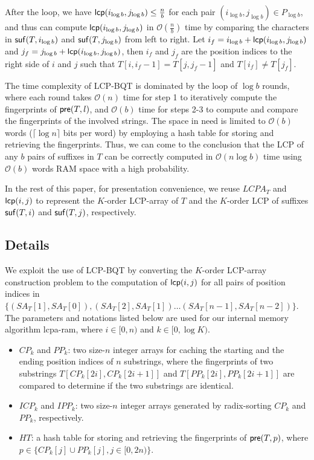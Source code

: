 \documentclass[10pt,journal,compsoc]{IEEEtran}
\begin{document}
\begin{CJK*}{GBK}{song}
After the loop, we have ${\sf lcp}(i_{\log b},j_{\log b}) \le \frac{n}{b}$ for each pair $(i_{\log b},j_{\log b}) \in P_{\log b}$, and thus can compute ${\sf lcp}(i_{\log b}, j_{\log b})$ in $\mathcal{O}(\frac{n}{b})$ time by comparing the characters in ${\sf suf}(T,i_{\log b})$ and ${\sf suf}(T,j_{\log b})$ from left to right. Let $i_{f} = i_{\log b} + {\sf lcp}(i_{\log b}, j_{\log b})$ and $j_{f}= j_{\log b} + {\sf lcp}(i_{\log b}, j_{\log b})$, then $i_{f}$ and $j_{f}$ are the position indices to the right side of $i$ and $j$ such that $T[i,i_{f}-1] = T[j,j_{f}-1]$ and $T[i_{f}] \neq T[j_{f}]$.

The time complexity of LCP-BQT is dominated by the loop of $\log b$ rounds, where each round takes $\mathcal{O}(n)$ time for step 1 to iteratively compute the fingerprints of ${\sf pre}(T,l)$, and $\mathcal{O}(b)$ time for steps 2-3 to compute and compare the fingerprints of the involved strings. The space in need is limited to $\mathcal{O}(b)$ words ($\lceil \log n\rceil$ bits per word) by employing a hash table for storing and retrieving the fingerprints. Thus, we can come to the conclusion that the LCP of any $b$ pairs of suffixes in $T$ can be correctly computed in $\mathcal{O}(n\log b)$ time using $\mathcal{O}(b)$ words RAM space with a high probability.

In the rest of this paper, for presentation convenience, we reuse $LCPA_T$ and ${\sf lcp}(i,j)$ to represent the $K$-order LCP-array of $T$ and the $K$-order LCP of suffixes ${\sf suf}(T,i)$ and ${\sf suf}(T,j)$, respectively.
\subsection{Details}\label{subsec:implementation_in_ram}

We exploit the use of LCP-BQT by converting the $K$-order LCP-array construction problem to the computation of ${\sf lcp}(i,j)$ for all pairs of position indices in $\{(SA_T[1], SA_T[0]),(SA_T[2], SA_T[1])\ldots (SA_T[n-1], SA_T[n-2])\}$. The parameters and notations listed below are used for our internal memory algorithm lcpa-ram, where $i\in [0,n)$ and $k\in [0,\log K)$.

\begin{itemize}
\item $CP_k$ and $PP_k$: two size-$n$ integer arrays for caching the starting and the ending position indices of  $n$ substrings, where the fingerprints of two substrings $T[CP_k[2i],CP_k[2i+1]]$ and $T[PP_k[2i],PP_k[2i+1]]$ are compared to determine if the two substrings are identical.
\item $ICP_k$ and $IPP_k$: two size-$n$ integer arrays generated by radix-sorting $CP_k$ and $PP_k$, respectively.
\item $HT$: a hash table for storing and retrieving the fingerprints of ${\sf pre}(T,p)$, where $p\in \{CP_k[j] \cup PP_k[j], j\in[0,2n)\}$.
\end{itemize}


\end{CJK*}
\end{document}
